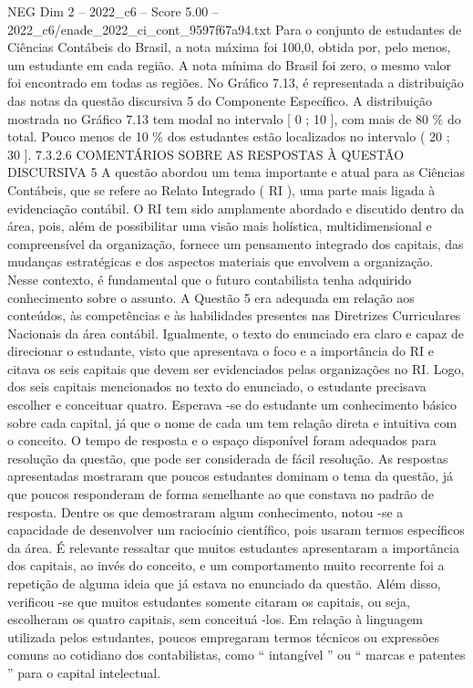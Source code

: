 \begin{textsample}{NEG Dim 2 – 2022\_c6 – Score 5.00 – 2022\_c6/enade\_2022\_ci\_cont\_9597f67a94.txt}
Para o conjunto de estudantes de Ciências Contábeis do Brasil, a nota máxima foi 100,0, obtida por, pelo menos, um estudante em cada região.
A nota mínima do Brasil foi zero, o mesmo valor foi encontrado em todas as regiões.
No Gráfico 7.13, é representada a distribuição das notas da questão discursiva 5 do Componente Específico.
A distribuição mostrada no Gráfico 7.13 tem modal no intervalo [ 0 ; 10 ], com mais de 80 \% do total.
Pouco menos de 10 \% dos estudantes estão localizados no intervalo ( 20 ; 30 ]. 7.3.2.6 COMENTÁRIOS SOBRE AS RESPOSTAS À QUESTÃO DISCURSIVA 5 A questão abordou um tema importante e atual para as Ciências Contábeis, que se refere ao Relato Integrado ( RI ), uma parte mais ligada à evidenciação contábil.
O RI tem sido amplamente abordado e discutido dentro da área, pois, além de possibilitar uma visão mais holística, multidimensional e compreensível da organização, fornece um pensamento integrado dos capitais, das mudanças estratégicas e dos aspectos materiais que envolvem a organização.
Nesse contexto, é fundamental que o futuro contabilista tenha adquirido conhecimento sobre o assunto.
A Questão 5 era adequada em relação aos conteúdos, às competências e às habilidades presentes nas Diretrizes Curriculares Nacionais da área contábil.
Igualmente, o texto do enunciado era claro e capaz de direcionar o estudante, visto que apresentava o foco e a importância do RI e citava os seis capitais que devem ser evidenciados pelas organizações no RI.
Logo, dos seis capitais mencionados no texto do enunciado, o estudante precisava escolher e conceituar quatro.
Esperava -se do estudante um conhecimento básico sobre cada capital, já que o nome de cada um tem relação direta e intuitiva com o conceito.
O tempo de resposta e o espaço disponível foram adequados para resolução da questão, que pode ser considerada de fácil resolução.
As respostas apresentadas mostraram que poucos estudantes dominam o tema da questão, já que poucos responderam de forma semelhante ao que constava no padrão de resposta.
Dentre os que demostraram algum conhecimento, notou -se a capacidade de desenvolver um raciocínio científico, pois usaram termos específicos da área.
É relevante ressaltar que muitos estudantes apresentaram a importância dos capitais, ao invés do conceito, e um comportamento muito recorrente foi a repetição de alguma ideia que já estava no enunciado da questão.
Além disso, verificou -se que muitos estudantes somente citaram os capitais, ou seja, escolheram os quatro capitais, sem conceituá -los.
Em relação à linguagem utilizada pelos estudantes, poucos empregaram termos técnicos ou expressões comuns ao cotidiano dos contabilistas, como “ intangível ” ou “ marcas e patentes ” para o capital intelectual.

\end{textsample}

